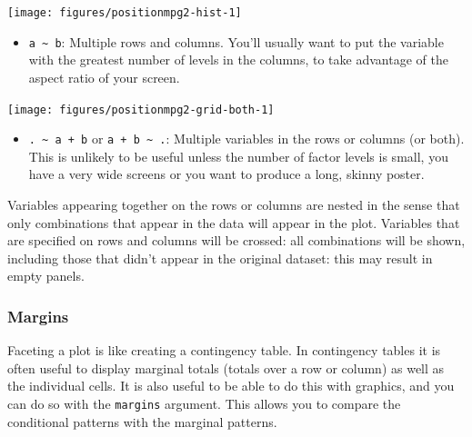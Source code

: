 \texttt{[image: figures/positionmpg2-hist-1]}

\begin{itemize}
\itemsep1pt\parskip0pt
\item
  \texttt{a \textasciitilde{} b}: Multiple rows and columns. You'll
  usually want to put the variable with the greatest number of levels in
  the columns, to take advantage of the aspect ratio of your screen.
\end{itemize}

\begin{Shaded}
\begin{Highlighting}[]
\NormalTok{>}\StringTok{ } \StringTok{ }\StringTok{ }
\end{Highlighting}
\end{Shaded}

\texttt{[image: figures/positionmpg2-grid-both-1]}

\begin{itemize}
\itemsep1pt\parskip0pt
\item
  \texttt{. \textasciitilde{} a + b} or
  \texttt{a + b \textasciitilde{} .}: Multiple variables in the rows or
  columns (or both). This is unlikely to be useful unless the number of
  factor levels is small, you have a very wide screens or you want to
  produce a long, skinny poster.
\end{itemize}

Variables appearing together on the rows or columns are nested in the
sense that only combinations that appear in the data will appear in the
plot. Variables that are specified on rows and columns will be crossed:
all combinations will be shown, including those that didn't appear in
the original dataset: this may result in empty panels.

\subsubsection{Margins}\label{sub:margins}

Faceting a plot is like creating a contingency table. In contingency
tables it is often useful to display marginal totals (totals over a row
or column) as well as the individual cells. It is also useful to be able
to do this with graphics, and you can do so with the \texttt{margins}
argument. This allows you to compare the conditional patterns with the
marginal patterns. 

